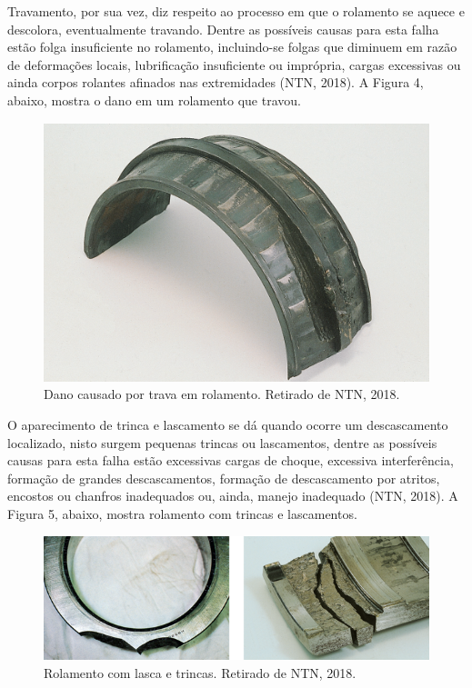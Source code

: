 \documentclass[
	12pt,				
	oneside,			
	a4paper,			
	english,			
	brazil				
	]{abntex2ppgsi}
\begin{document}
Travamento, por sua vez, diz respeito ao processo em que o rolamento se aquece e descolora, eventualmente travando. Dentre as possíveis causas para esta falha estão folga insuficiente no rolamento, incluindo-se folgas que diminuem em razão de deformações locais, lubrificação insuficiente ou imprópria, cargas excessivas ou ainda corpos rolantes afinados nas extremidades (NTN, 2018). A Figura 4, abaixo, mostra o dano em um rolamento que travou.

\begin{figure}[!htb]
\centering
\includegraphics{Figura4}
\caption {Dano causado por trava em rolamento. Retirado de NTN, 2018.}
\label{Figura4}
\end{figure}


O aparecimento de trinca e lascamento se dá quando ocorre um descascamento localizado, nisto surgem pequenas trincas ou lascamentos, dentre as possíveis causas para esta falha estão excessivas cargas de choque, excessiva interferência, formação de grandes descascamentos, formação de descascamento por atritos, encostos ou chanfros inadequados ou, ainda, manejo inadequado (NTN, 2018). A Figura 5, abaixo, mostra rolamento com trincas e lascamentos. 

\begin{figure}[!htb]
\centering
\includegraphics{Figura5}
\caption {Rolamento com lasca e trincas. Retirado de NTN, 2018.}
\label{Figura5}
\end{figure}
\end{document}

